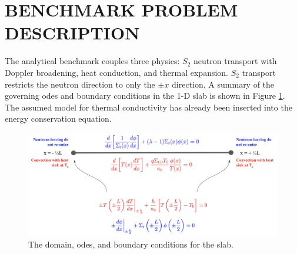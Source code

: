 \documentclass[letterpaper]{mc2023}
\begin{document}
\section{BENCHMARK PROBLEM DESCRIPTION}
\label{sec:benchmark}
The analytical benchmark couples three physics: $S_2$ neutron transport with Doppler broadening, heat conduction, and thermal
expansion. $S_{2}$ transport restricts the neutron direction to only the $\pm x$ direction. A summary of the governing \glspl{ode}
and boundary conditions in the 1-D slab is shown in Figure \ref{fig:slab_diagram}. The assumed model for thermal conductivity has
already been inserted into the energy conservation equation.
\begin{figure}[H]
    \centering
    \includegraphics[width=0.85\linewidth]{figures/1D_Benchmark_Diagram.png}
    \caption{The domain, \glspl{ode}, and boundary conditions for the slab.}
    \label{fig:slab_diagram}
\end{figure}
\end{document}
